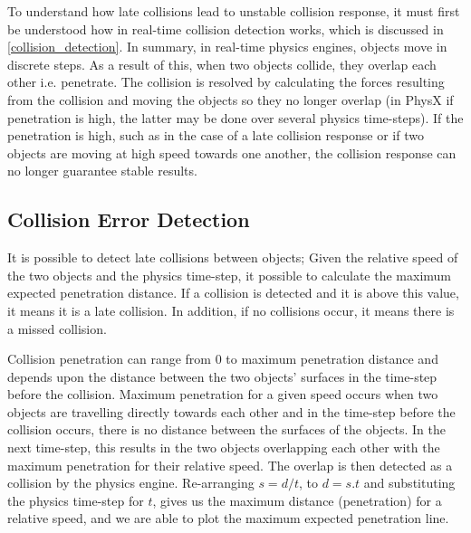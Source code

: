 
To understand how late collisions lead to unstable collision response, it must first be understood how in real-time collision detection works, which is discussed in \ref{collision_detection}. In summary, in real-time physics engines, objects move in discrete steps. As a result of this, when two objects collide, they overlap each other i.e. penetrate. The collision is resolved by calculating the forces resulting from the collision and moving the objects so they no longer overlap (in PhysX if penetration is high, the latter may be done over several physics time-steps). If the penetration is high, such as in the case of a late collision response or if two objects are moving at high speed towards one another, the collision response can no longer guarantee stable results.

\subsection{Collision Error Detection}
It is possible to detect late collisions between objects; Given the relative speed of the two objects and the physics time-step, it possible to calculate the maximum expected penetration distance. If a collision is detected and it is above this value, it means it is a late collision. In addition, if no collisions occur, it means there is a missed collision.

Collision penetration can range from 0 to maximum penetration distance and depends upon the distance between the two objects' surfaces in the time-step before the collision. Maximum penetration for a given speed occurs when two objects are travelling directly towards each other and in the time-step before the collision occurs, there is no distance between the surfaces of the objects. In the next time-step, this results in the two objects overlapping each other with the maximum penetration for their relative speed. The overlap is then detected as a collision by the physics engine.  Re-arranging $s=d/t$, to $d=s.t$ and substituting the physics time-step for $t$, gives us the maximum distance (penetration) for a relative speed, and we are able to plot the maximum expected penetration line.


